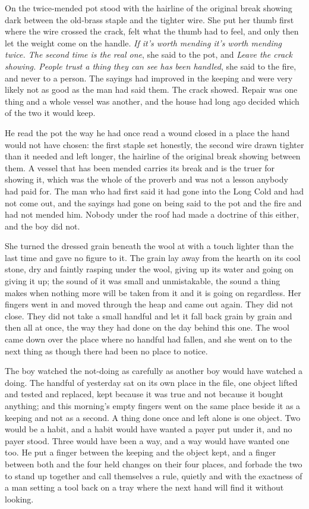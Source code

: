On  the twice-mended pot stood with the hairline of the original break showing dark between the old-brass staple and the tighter wire. She put her thumb first where the wire crossed the crack, felt what the thumb had to feel, and only then let the weight come on the handle. \emph{If it's worth mending it's worth mending twice. The second time is the real one}, she said to the pot, and \emph{Leave the crack showing. People trust a thing they can see has been handled}, she said to the fire, and never to a person. The sayings had improved in the keeping and were very likely not as good as the man had said them. The crack showed. Repair was one thing and a whole vessel was another, and the house had long ago decided which of the two it would keep.

He read the pot the way he had once read a wound closed in a place the hand would not have chosen: the first staple set honestly, the second wire drawn tighter than it needed and left longer, the hairline of the original break showing between them. A vessel that has been mended carries its break and is the truer for showing it, which was the whole of the proverb and was not a lesson anybody had paid for. The man who had first said it had gone into the Long Cold and had not come out, and the sayings had gone on being said to the pot and the fire and had not mended him. Nobody under the roof had made a doctrine of this either, and the boy did not.

\scenebreak

She turned the dressed grain beneath the wool at  with a touch lighter than the last time and gave no figure to it. The grain lay away from the hearth on its cool stone, dry and faintly rasping under the wool, giving up its water and going on giving it up; the sound of it was small and unmistakable, the sound a thing makes when nothing more will be taken from it and it is going on regardless. Her fingers went in and moved through the heap and came out again. They did not close. They did not take a small handful and let it fall back grain by grain and then all at once, the way they had done on the day behind this one. The wool came down over the place where no handful had fallen, and she went on to the next thing as though there had been no place to notice.

The boy watched the not-doing as carefully as another boy would have watched a doing. The handful of yesterday sat on its own place in the file, one object lifted and tested and replaced, kept because it was true and not because it bought anything; and this morning's empty fingers went on the same place beside it as a keeping and not as a second. A thing done once and left alone is one object. Two would be a habit, and a habit would have wanted a payer put under it, and no payer stood. Three would have been a way, and a way would have wanted one too. He put a finger between the keeping and the object kept, and a finger between both and the four held changes on their four places, and forbade the two to stand up together and call themselves a rule, quietly and with the exactness of a man setting a tool back on a tray where the next hand will find it without looking.

